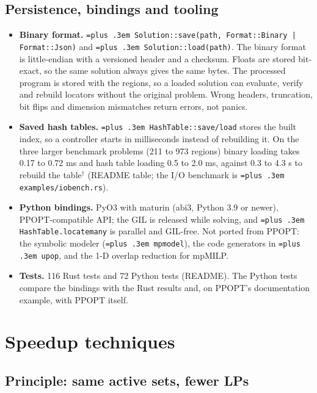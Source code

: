 \documentclass[10pt,a4paper]{article}
\newcommand{\busy}{$^\dagger$}
\newcommand{\ppopt}{PPOPT}
\newcommand{\code}[1]{{\let\_\bu\texttt{\spaceskip=\fontdimen2\font plus .3em #1}}}
\newcommand{\bu}{\textunderscore\hspace{0pt}}
\begin{document}
\subsection{Persistence, bindings and tooling}

\begin{itemize}
  \item \textbf{Binary format.} \code{Solution::\allowbreak{}save(path, Format::\allowbreak{}Binary | Format::\allowbreak{}Json)} and \code{Solution::\allowbreak{}load(path)}. The
    binary format is little-endian with a versioned header and a checksum. Floats are stored bit-exact, so the same solution always
    gives the same bytes. The processed program is stored with the regions, so a loaded solution can evaluate, verify and rebuild
    locators without the original problem. Wrong headers, truncation, bit flips and dimension mismatches return errors, not panics.
  \item \textbf{Saved hash tables.} \code{HashTable::\allowbreak{}save/load} stores the built index, so a controller starts in milliseconds
    instead of rebuilding it. On the three larger benchmark problems (211 to 973 regions) binary loading takes 0.17 to 0.72 ms and
    hash table loading 0.5 to 2.0 ms, against 0.3 to 4.3 s to rebuild the table\busy{} (README table; the
    I/O benchmark is \code{examples/io\_bench.rs}).
  \item \textbf{Python bindings.} PyO3 with maturin (abi3, Python 3.9 or newer), \ppopt{}-compatible API; the GIL is released while
    solving, and \code{HashTable.locate\_many} is parallel and GIL-free. Not ported from \ppopt{}: the symbolic modeler
    (\code{mpmodel}), the code generators in \code{upop}, and the 1-D overlap reduction for mpMILP.
  \item \textbf{Tests.} 116 Rust tests and 72 Python tests (README). The Python tests compare the bindings with the Rust results and,
    on \ppopt{}'s documentation example, with \ppopt{} itself.
\end{itemize}

\section{Speedup techniques}
\label{sec:techniques}

\subsection{Principle: same active sets, fewer LPs}
\end{document}
